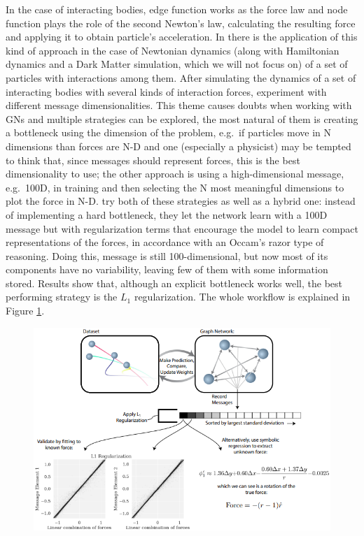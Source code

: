 \documentclass[../../master_thesis_np.tex]{subfiles}
\begin{document}
	In the case of interacting bodies, edge function works as the force law and node function plays the role of the second Newton's law, calculating the resulting force and applying it to obtain particle's acceleration. In \cite{cranmer_discovering_2020} there is the application of this kind of approach in the case of Newtonian dynamics (along with Hamiltonian dynamics and a Dark Matter simulation, which we will not focus on) of a set of particles with interactions among them. After simulating the dynamics of a set of interacting bodies with several kinds of interaction forces, \citeauthor{cranmer_discovering_2020} experiment with different message dimensionalities. This theme causes doubts when working with GNs and multiple strategies can be explored, the most natural of them is creating a bottleneck using the dimension of the problem, e.g.~if particles move in N dimensions than forces are N-D and one (especially a physicist) may be tempted to think that, since messages should represent forces, this is the best dimensionality to use; the other approach is using a high-dimensional message, e.g.~100D, in training and then selecting the N most meaningful dimensions to plot the force in N-D. \citeauthor{cranmer_discovering_2020} try both of these strategies as well as a hybrid one: instead of implementing a hard bottleneck, they let the network learn with a 100D message but with regularization terms that encourage the model to learn compact representations of the forces, in accordance with an Occam's razor type of reasoning. Doing this, message is still 100-dimensional, but now most of its components have no variability, leaving few of them with some information stored. Results show that, although an explicit bottleneck works well, the best performing strategy is the $L_1$ regularization. The whole workflow is explained in Figure \ref{fig:cranmer1}.
	
	 \begin{figure}[htp]
		\centering
		\includegraphics[width=\singfigwidth]{cranmer1.png}
		\caption{\parencite{cranmer_discovering_2020}}
		\label{fig:cranmer1}
	\end{figure}
	
\end{document}
